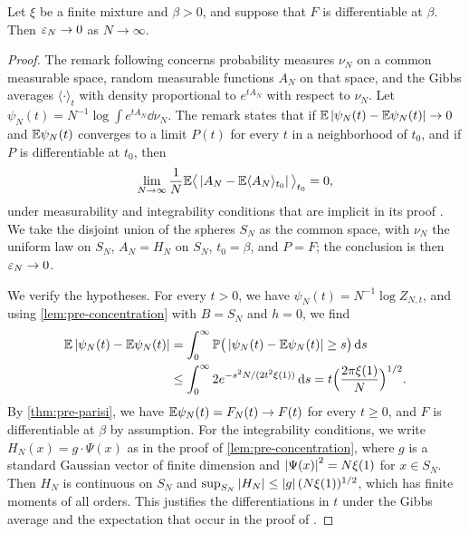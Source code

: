 \begin{proposition}\label{prop:dir-selfaveraging}
Let $\xi$ be a finite mixture and $\beta>0$, and suppose that $F$ is differentiable at $\beta$. Then $\varepsilon_N\to0$ as $N\to\infty$.
\end{proposition}

\begin{proof}
The remark following \cite[Theorem~1.1]{Panchenko2010GG} concerns probability measures $\nu_N$ on a common measurable space, random measurable functions $A_N$ on that space, and the Gibbs averages $\langle\cdot\rangle_t$ with density proportional to $e^{tA_N}$ with respect to $\nu_N$. Let $\psi_N(t)=N^{-1}\log\int e^{tA_N}\dd\nu_N$. The remark states that if $\mathbb E\left|\psi_N(t)-\mathbb E\psi_N(t)\right|\to0$ and $\mathbb E\psi_N(t)$ converges to a limit $P(t)$ for every $t$ in a neighborhood of $t_0$, and if $P$ is differentiable at $t_0$, then
\[
\lim_{N\to\infty}\frac1N\mathbb E\big\langle\left|A_N-\mathbb E\langle A_N\rangle_{t_0}\right|\big\rangle_{t_0}=0,
\]
under measurability and integrability conditions that are implicit in its proof \cite[(7), p.~190]{Panchenko2010GG}.
We take the disjoint union of the spheres $S_N$ as the common space, with $\nu_N$ the uniform law on $S_N$, $A_N=H_N$ on $S_N$, $t_0=\beta$, and $P=F$; the conclusion is then $\varepsilon_N\to0$.

We verify the hypotheses. For every $t>0$, we have $\psi_N(t)=N^{-1}\log Z_{N,t}$, and using \cref{lem:pre-concentration} with $B=S_N$ and $h=0$, we find
\[
\begin{split}
\mathbb E\left|\psi_N(t)-\mathbb E\psi_N(t)\right|&=\int_0^\infty\mathbb P\big(\left|\psi_N(t)-\mathbb E\psi_N(t)\right|\ge s\big)\,\mathrm d s\\
&\le\int_0^\infty2e^{-s^2N/(2t^2\xi(1))}\,\mathrm d s=t\Big(\frac{2\pi\xi(1)}N\Big)^{1/2}.
\end{split}
\]
By \cref{thm:pre-parisi}, we have $\mathbb E\psi_N(t)=F_N(t)\to F(t)$ for every $t\ge0$, and $F$ is differentiable at $\beta$ by assumption. For the integrability conditions, we write $H_N(x)=g\cdot\Psi(x)$ as in the proof of \cref{lem:pre-concentration}, where $g$ is a standard Gaussian vector of finite dimension and $\left|\Psi(x)\right|^2=N\xi(1)$ for $x\in S_N$. Then $H_N$ is continuous on $S_N$ and $\sup_{S_N}\left|H_N\right|\le\left|g\right|(N\xi(1))^{1/2}$, which has finite moments of all orders. This justifies the differentiations in $t$ under the Gibbs average and the expectation that occur in the proof of \cite[(7)]{Panchenko2010GG}.
\end{proof}

